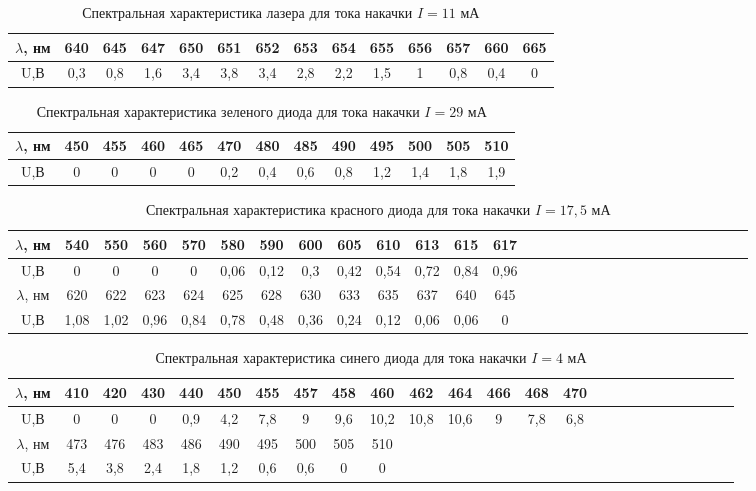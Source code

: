 \documentclass[a4paper,12pt]{article}
\begin{document}
\begin{table}[h]
	\caption{Спектральная характеристика лазера для тока накачки $I = 11$ мА}
	\begin{tabular}{|c|c|c|c|c|c|c|c|c|c|c|c|c|c|}
	\hline
	$\lambda$, нм & 640 & 645 & 647 & 650 & 651 & 652 & 653 & 654 & 655 & 656 & 657 & 660 & 665 \\ \hline
	U,В        & 0,3 & 0,8 & 1,6 & 3,4 & 3,8 & 3,4 & 2,8 & 2,2 & 1,5 & 1   & 0,8 & 0,4 & 0   \\ \hline
	\end{tabular}
	\end{table}

\begin{table}[h]
	\caption{Спектральная характеристика зеленого диода для тока накачки $I = 29$ мА}
	\begin{tabular}{|c|c|c|c|c|c|c|c|c|c|c|c|c|}
	\hline
	$\lambda$, нм & 450 & 455 & 460 & 465 & 470 & 480 & 485 & 490 & 495 & 500 & 505 & 510 \\ \hline
	U,В        & 0   & 0   & 0   & 0   & 0,2 & 0,4 & 0,6 & 0,8 & 1,2 & 1,4 & 1,8 & 1,9 \\ \hline
	\end{tabular}
	\end{table}

\begin{table}[h!]
	\caption{Спектральная характеристика красного диода для тока накачки $I = 17,5$ мА}
	\begin{tabular}{|c|c|c|c|c|c|c|c|c|c|c|c|c|c|c|c|c|c|c|c|c|c|c|c|c|c|c|c|c|}
		\hline
		$\lambda$, нм & 540 & 550 & 560 & 570 & 580  & 590  & 600 & 605  & 610  & 613  & 615  & 617   \\ \hline
		U,В        & 0   & 0   & 0   & 0   & 0,06 & 0,12 & 0,3 & 0,42 & 0,54 & 0,72 & 0,84 & 0,96\\ \hline
		$\lambda$, нм & 620  & 622  & 623  & 624  & 625  & 628  & 630  & 633  & 635  & 637  & 640  & 645 \\ \hline	
		U,В       & 1,08 & 1,02 & 0,96 & 0,84 & 0,78 & 0,48 & 0,36 & 0,24 & 0,12 & 0,06 & 0,06 & 0   \\ \hline
	\end{tabular}
\end{table}

\begin{table}[h!]
	\caption{Спектральная характеристика синего диода для тока накачки $I = 4$ мА}
	\begin{tabular}{|c|c|c|c|c|c|c|c|c|c|c|c|c|c|c|c|c|c|c|c|c|c|c|c|c|}
	\hline
	$\lambda$, нм & 410 & 420 & 430 & 440 & 450 & 455 & 457 & 458 & 460  & 462  & 464  & 466 & 468 & 470 \\ \hline
	U,В        & 0   & 0   & 0   & 0,9 & 4,2 & 7,8 & 9   & 9,6 & 10,2 & 10,8 & 10,6 & 9   & 7,8 & 6,8 \\ \hline
	$\lambda$, нм &473 & 476  & 483 & 486 & 490 & 495 & 500 & 505 & 510   \\ \hline
	U,В        &5,4 & 3,8 & 2,4 & 1,8 & 1,2 & 0,6 & 0,6 & 0   & 0 \\ \hline
	\end{tabular}
\end{table}
\end{document}
